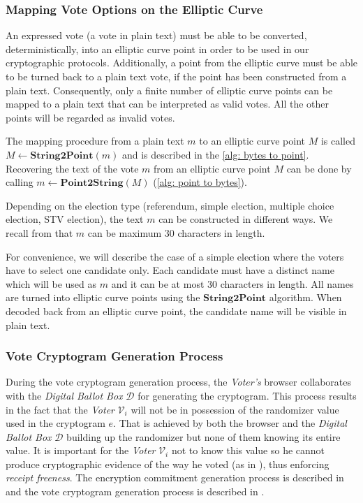 \color{orange}
\subsubsection{Mapping Vote Options on the Elliptic Curve} \label{sec: mapping vote options on the elliptic curve}
\color{black}
An expressed vote (a vote in plain text) must be able to be converted, deterministically, into an elliptic curve point in order to be used in our cryptographic protocols. Additionally, a point from the elliptic curve must be able to be turned back to a plain text vote, if the point has been constructed from a plain text. Consequently, only a finite number of elliptic curve points can be mapped to a plain text that can be interpreted as valid votes. All the other points will be regarded as invalid votes. 

The mapping procedure from a plain text $m$ to an elliptic curve point $M$ is called \( M \leftarrow \mathbf{String2Point}(m) \) and is described in the \cref{alg: bytes to point}. Recovering the text of the vote $m$ from an elliptic curve point $M$ can be done by calling \( m \leftarrow \mathbf{Point2String}(M) \) (\cref{alg: point to bytes}).

Depending on the election type (referendum, simple election, multiple choice election, STV election), the text $m$ can be constructed in different ways. We recall from  that $m$ can be maximum 30 characters in length. 

For convenience, we will describe the case of a simple election where the voters have to select one candidate only. Each candidate must have a distinct name which will be used as $m$ and it can be at most 30 characters in length. All names are turned into elliptic curve points using the $\textbf{String2Point}$ algorithm. When decoded back from an elliptic curve point, the candidate name will be visible in plain text.


\subsubsection{Vote Cryptogram Generation Process} \label{sec: vote cryptogram generation process}
During the vote cryptogram generation process, the \textit{Voter's} browser collaborates with the \textit{Digital Ballot Box} $\mathcal{D}$ for generating the cryptogram. This process results in the fact that the \textit{Voter} $\mathcal{V}_i$ will not be in possession of the randomizer value used in the cryptogram $e$. That is achieved by both the browser and the \textit{Digital Ballot Box} $\mathcal{D}$ building up the randomizer but none of them knowing its entire value. It is important for the \textit{Voter} $\mathcal{V}_i$ not to know this value so he cannot produce cryptographic evidence of the way he voted (as in ), thus enforcing \textit{receipt freeness}. The encryption commitment generation process is described in  and the vote cryptogram generation process is described in .

